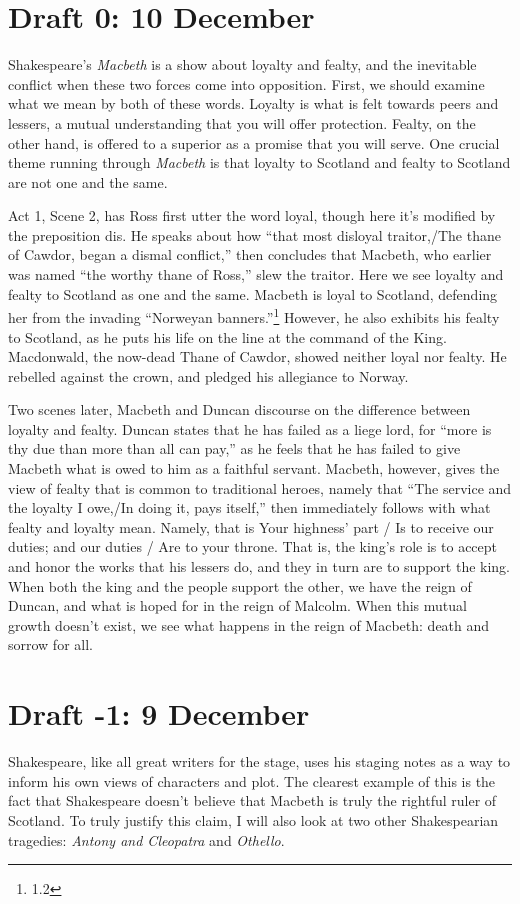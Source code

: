 \documentclass[12pt]{article}[titlepage]
\newcommand{\say}[1]{``#1''}
\newcommand{\1}{\={a}}
\newcommand{\2}{\={e}}
\newcommand{\3}{\={\i}}
\newcommand{\4}{\=o}
\newcommand{\5}{\=u}
\newcommand{\6}{\={A}}
\renewcommand{\,}{\textsuperscript{,}}
\begin{document}
\section{Draft 0: 10 December}
Shakespeare's \textit{Macbeth} is a show about loyalty and fealty, and the inevitable conflict when these two forces come into opposition.
First, we should examine what we mean by both of these words.
Loyalty is what is felt towards peers and lessers, a mutual understanding that you will offer protection.
Fealty, on the other hand, is offered to a superior as a promise that you will serve.
One crucial theme running through \textit{Macbeth} is that loyalty to Scotland and fealty to Scotland are not one and the same.

Act 1, Scene 2, has Ross first utter the word loyal, though here it's modified by the preposition dis.
He speaks about how \say{that most disloyal traitor,/The thane of Cawdor, began a dismal conflict,} then concludes that Macbeth, who earlier was named \say{the worthy thane of Ross,} slew the traitor.
Here we see loyalty and fealty to Scotland as one and the same.
Macbeth is loyal to Scotland, defending her from the invading \say{Norweyan banners.}\footnote{1.2}
However, he also exhibits his fealty to Scotland, as he puts his life on the line at the command of the King.
Macdonwald, the now-dead Thane of Cawdor, showed neither loyal nor fealty.
He rebelled against the crown, and pledged his allegiance to Norway.

Two scenes later, Macbeth and Duncan discourse on the difference between loyalty and fealty.
Duncan states that he has failed as a liege lord, for \say{more is thy due than more than all can pay,} as he feels that he has failed to give Macbeth what is owed to him as a faithful servant.
Macbeth, however, gives the view of fealty that is common to traditional heroes, namely that \say{The service and the loyalty I owe,/In doing it, pays itself,} then immediately follows with what fealty and loyalty mean.
Namely, that is {Your highness' part / Is to receive our duties; and our duties / Are to your throne.}
That is, the king's role is to accept and honor the works that his lessers do, and they in turn are to support the king.
When both the king and the people support the other, we have the reign of Duncan, and what is hoped for in the reign of Malcolm.
When this mutual growth doesn't exist, we see what happens in the reign of Macbeth: death and sorrow for all.


\section{Draft -1: 9 December}
Shakespeare, like all great writers for the stage, uses his staging notes as a way to inform his own views of characters and plot.
The clearest example of this is the fact that Shakespeare doesn't believe that Macbeth is truly the rightful ruler of Scotland.
To truly justify this claim, I will also look at two other Shakespearian tragedies: \textit{Antony and Cleopatra} and \textit{Othello}.
\end{document}
